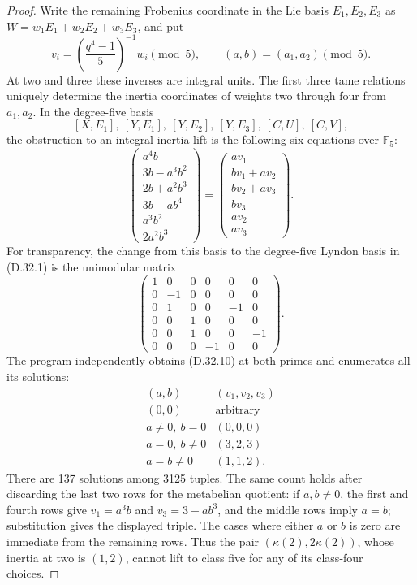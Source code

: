 \begin{proof}
Write the remaining Frobenius coordinate in
the Lie basis \(E_1,E_2,E_3\) as
\(W=w_1E_1+w_2E_2+w_3E_3\), and put
\[
        v_i=\left(\frac{q^4-1}{5}\right)^{-1}w_i
                     \pmod5,
        \qquad (a,b)=(a_1,a_2)\pmod5.
\]
At two and three these inverses are integral
units. The first three tame relations uniquely
determine the inertia coordinates of weights
two through four from \(a_1,a_2\). In the
degree-five basis
\[
 [X,E_1],\ [Y,E_1],\ [Y,E_2],\ [Y,E_3],\ [C,U],\ [C,V],
\]
the obstruction to an integral inertia lift
is the following six equations over
\(\mathbb F_5\):
\[
 \begin{pmatrix}
 a^4b\\3b-a^3b^2\\2b+a^2b^3\\3b-ab^4\\a^3b^2\\2a^2b^3
 \end{pmatrix}
 =
 \begin{pmatrix}
 av_1\\bv_1+av_2\\bv_2+av_3\\bv_3\\av_2\\av_3
 \end{pmatrix}.                                \tag{D.32.10}
\]
For transparency, the change from this basis
to the degree-five Lyndon basis in (D.32.1)
is the unimodular matrix
\[
 \begin{pmatrix}
 1&0&0&0&0&0\\0&-1&0&0&0&0\\0&1&0&0&-1&0\\
 0&0&1&0&0&0\\0&0&1&0&0&-1\\0&0&0&-1&0&0
 \end{pmatrix}.                                \tag{D.32.11}
\]
The program independently obtains (D.32.10)
at both primes and enumerates all its solutions:
\[
 \begin{array}{c|c}
 (a,b)&(v_1,v_2,v_3)\\\hline
 (0,0)&\text{arbitrary}\\
 a\ne0,\ b=0&(0,0,0)\\
 a=0,\ b\ne0&(3,2,3)\\
 a=b\ne0&(1,1,2).
 \end{array}                                             \tag{D.32.12}
\]
There are 137 solutions among 3125 tuples.
The same count holds after discarding the last
two rows for the metabelian quotient: if
\(a,b\ne0\), the first and fourth rows give
\(v_1=a^3b\) and \(v_3=3-a b^3\), and the
middle rows imply \(a=b\); substitution gives
the displayed triple. The cases where either
\(a\) or \(b\) is zero are immediate from
the remaining rows. Thus the pair
\((\kappa(2),2\kappa(2))\), whose inertia
at two is \((1,2)\), cannot lift to class
five for any of its class-four choices.


\end{proof}

